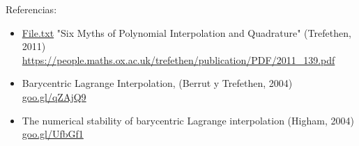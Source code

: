 \documentclass{beamer}
\begin{document}
\begin{frame}

Referencias: \bigskip
\begin{itemize}
    \item \href{run:./file.txt}{File.txt}   "Six Myths of Polynomial Interpolation and
Quadrature" (Trefethen, 2011) \url{https://people.maths.ox.ac.uk/trefethen/publication/PDF/2011_139.pdf}
    \item Barycentric Lagrange Interpolation, (Berrut y Trefethen, 2004) \url{goo.gl/qZAjQ9}
    \item The numerical stability of barycentric Lagrange
interpolation (Higham, 2004) \url{goo.gl/UfbGf1}
\end{itemize}
\end{frame}
\end{document}
